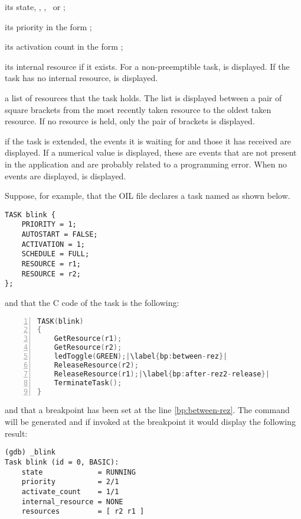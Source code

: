 \begin{pitemize}
\item its state, \SUSPENDED, \READY, \RUNNING\ or \WAITING;
\item its priority in the form ;
\item its activation count in the form ;
\item its internal resource if it exists. For a non-preemptible task,  is displayed. If the task has no internal resource,  is displayed.
\item a list of resources that the task holds. The list is displayed between a pair of square brackets from the most recently taken resource to the oldest taken resource. If no resource is held, only the pair of brackets is displayed. 
\item if the task is extended, the events it is waiting for and those it has received are displayed. If a numerical value is displayed, these are events that are not present in the application and are probably related to a programming error. When no events are displayed,  is displayed.
\end{pitemize}

Suppose, for example, that the OIL file declares a task named  as shown below.

\begin{lstlisting}[language=OIL]
TASK blink {
    PRIORITY = 1;
    AUTOSTART = FALSE;
    ACTIVATION = 1;
    SCHEDULE = FULL;
    RESOURCE = r1;
    RESOURCE = r2;
};
\end{lstlisting}

and that the C code of the task  is the following:

\begin{lstlisting}[language=C,escapechar=|,numbers=left]
TASK(blink)
{
    GetResource(r1);
    GetResource(r2);
    ledToggle(GREEN);|\label{bp:between-rez}|
    ReleaseResource(r2);
    ReleaseResource(r1);|\label{bp:after-rez2-release}|
    TerminateTask();
}
\end{lstlisting}
 
and that a breakpoint has been set at the line \ref{bp:between-rez}. The command  will be generated and if invoked at the breakpoint it would display the following result:

\begin{lstlisting}
(gdb) _blink 
Task blink (id = 0, BASIC):
	state             = RUNNING
	priority          = 2/1
	activate_count    = 1/1
	internal_resource = NONE
	resources         = [ r2 r1 ]
\end{lstlisting} 

